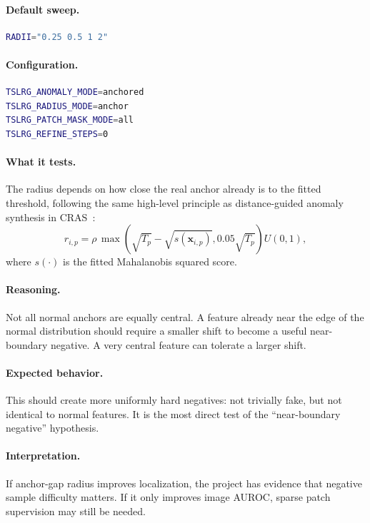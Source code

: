 \documentclass[11pt]{article}
\begin{document}
\paragraph{Default sweep.}
\begin{lstlisting}[language=bash]
RADII="0.25 0.5 1 2"
\end{lstlisting}

\paragraph{Configuration.}
\begin{lstlisting}[language=bash]
TSLRG_ANOMALY_MODE=anchored
TSLRG_RADIUS_MODE=anchor
TSLRG_PATCH_MASK_MODE=all
TSLRG_REFINE_STEPS=0
\end{lstlisting}

\paragraph{What it tests.}
The radius depends on how close the real anchor already is to the fitted
threshold, following the same high-level principle as distance-guided anomaly
synthesis in CRAS~\cite{cras}:
\begin{equation}
  r_{i,p}
  =
  \rho\,
  \max\left(
    \sqrt{T_p} - \sqrt{s(\mathbf{x}_{i,p})},
    0.05\sqrt{T_p}
  \right)
  U(0,1),
\end{equation}
where $s(\cdot)$ is the fitted Mahalanobis squared score.

\paragraph{Reasoning.}
Not all normal anchors are equally central. A feature already near the edge of
the normal distribution should require a smaller shift to become a useful
near-boundary negative. A very central feature can tolerate a larger shift.

\paragraph{Expected behavior.}
This should create more uniformly hard negatives: not trivially fake, but not
identical to normal features. It is the most direct test of the ``near-boundary
negative'' hypothesis.

\paragraph{Interpretation.}
If anchor-gap radius improves localization, the project has evidence that
negative sample difficulty matters. If it only improves image AUROC, sparse
patch supervision may still be needed.
\end{document}
